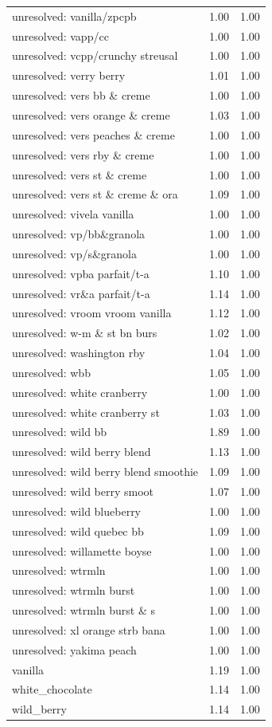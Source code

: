 \begin{table}
\begin{tabular}{lrr}
unresolved: vanilla/zpcpb & 1.00 & 1.00 \\
unresolved: vapp/cc & 1.00 & 1.00 \\
unresolved: vcpp/crunchy streusal & 1.00 & 1.00 \\
unresolved: verry berry & 1.01 & 1.00 \\
unresolved: vers bb \& creme & 1.00 & 1.00 \\
unresolved: vers orange \& creme & 1.03 & 1.00 \\
unresolved: vers peaches \& creme & 1.00 & 1.00 \\
unresolved: vers rby \& creme & 1.00 & 1.00 \\
unresolved: vers st \& creme & 1.00 & 1.00 \\
unresolved: vers st \& creme \& ora & 1.09 & 1.00 \\
unresolved: vivela vanilla & 1.00 & 1.00 \\
unresolved: vp/bb\&granola & 1.00 & 1.00 \\
unresolved: vp/s\&granola & 1.00 & 1.00 \\
unresolved: vpba parfait/t-a & 1.10 & 1.00 \\
unresolved: vr\&a parfait/t-a & 1.14 & 1.00 \\
unresolved: vroom vroom vanilla & 1.12 & 1.00 \\
unresolved: w-m \& st bn burs & 1.02 & 1.00 \\
unresolved: washington rby & 1.04 & 1.00 \\
unresolved: wbb & 1.05 & 1.00 \\
unresolved: white cranberry & 1.00 & 1.00 \\
unresolved: white cranberry st & 1.03 & 1.00 \\
unresolved: wild bb & 1.89 & 1.00 \\
unresolved: wild berry blend & 1.13 & 1.00 \\
unresolved: wild berry blend smoothie & 1.09 & 1.00 \\
unresolved: wild berry smoot & 1.07 & 1.00 \\
unresolved: wild blueberry & 1.00 & 1.00 \\
unresolved: wild quebec bb & 1.09 & 1.00 \\
unresolved: willamette boyse & 1.00 & 1.00 \\
unresolved: wtrmln & 1.00 & 1.00 \\
unresolved: wtrmln burst & 1.00 & 1.00 \\
unresolved: wtrmln burst \& s & 1.00 & 1.00 \\
unresolved: xl orange strb bana & 1.00 & 1.00 \\
unresolved: yakima peach & 1.00 & 1.00 \\
vanilla & 1.19 & 1.00 \\
white\_chocolate & 1.14 & 1.00 \\
wild\_berry & 1.14 & 1.00 \\
\bottomrule
\end{tabular}
\end{table}
